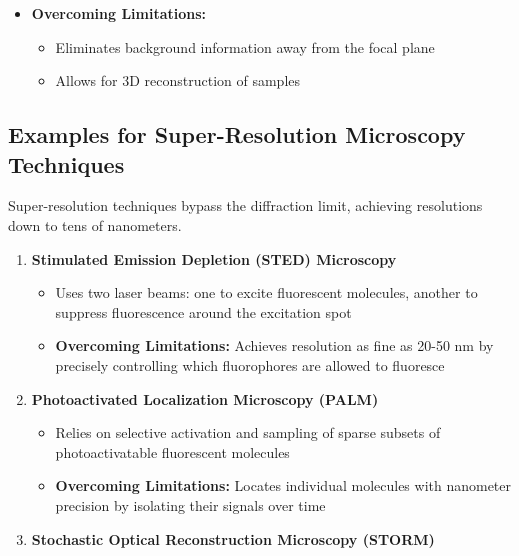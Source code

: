 \documentclass[
  a4paper,
]{book}
\providecommand{\tightlist}{%
  \setlength{\itemsep}{0pt}\setlength{\parskip}{0pt}}
\begin{document}
\begin{tcolorbox}
\begin{itemize}
  \begin{itemize}
  \tightlist
  \item
    Improved optical resolution and contrast
  \item
    Ability to collect serial optical sections from thick specimens
  \item
    Widely used in biological sciences
  \end{itemize}
\item
  \textbf{Overcoming Limitations:}

  \begin{itemize}
  \tightlist
  \item
    Eliminates background information away from the focal plane
  \item
    Allows for 3D reconstruction of samples
  \end{itemize}
\end{itemize}

\subsection{Examples for Super-Resolution Microscopy
Techniques}\label{examples-for-super-resolution-microscopy-techniques}

Super-resolution techniques bypass the diffraction limit, achieving
resolutions down to tens of nanometers.

\begin{enumerate}
\def\labelenumi{\arabic{enumi}.}
\tightlist
\item
  \textbf{Stimulated Emission Depletion (STED) Microscopy}

  \begin{itemize}
  \tightlist
  \item
    Uses two laser beams: one to excite fluorescent molecules, another
    to suppress fluorescence around the excitation spot
  \item
    \textbf{Overcoming Limitations:} Achieves resolution as fine as
    20-50 nm by precisely controlling which fluorophores are allowed to
    fluoresce
  \end{itemize}
\item
  \textbf{Photoactivated Localization Microscopy (PALM)}

  \begin{itemize}
  \tightlist
  \item
    Relies on selective activation and sampling of sparse subsets of
    photoactivatable fluorescent molecules
  \item
    \textbf{Overcoming Limitations:} Locates individual molecules with
    nanometer precision by isolating their signals over time
  \end{itemize}
\item
  \textbf{Stochastic Optical Reconstruction Microscopy (STORM)}


\end{enumerate}
\end{tcolorbox}
\end{document}
